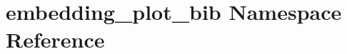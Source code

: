 \hypertarget{namespaceembedding__plot__bib}{
\section{embedding\_\-plot\_\-bib Namespace Reference}
\label{namespaceembedding__plot__bib}
}
